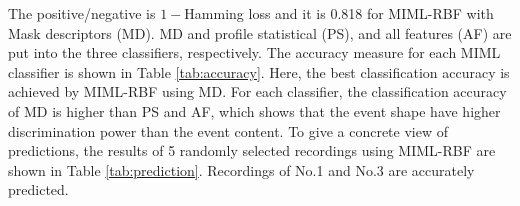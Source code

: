 The positive/negative is $1-$Hamming loss and it is 0.818 for MIML-RBF with Mask descriptors (MD). MD and profile statistical (PS), and all features (AF) are put into the three classifiers, respectively. The accuracy measure for each MIML classifier is shown in Table \ref{tab:accuracy}. Here, the best classification accuracy is achieved by MIML-RBF using MD. For each classifier, the classification accuracy of MD is higher than PS and AF, which shows that the event shape have higher discrimination power than the event content. To give a concrete view of predictions, the results of 5 randomly selected recordings using MIML-RBF are shown in Table \ref{tab:prediction}. Recordings of No.1 and No.3 are accurately predicted. 




\begin{table}[htb!]
\centering
\caption[Accuracy measure for MIML classifiers with different feature representations]{Accuracy measure for MIML classifiers with different feature representations. Here, $\downarrow$ indicates ‘the smaller the better’, while ‘$\uparrow$’ indicates ‘the bigger the better’.}
\label{tab:accuracy}
\end{table}




